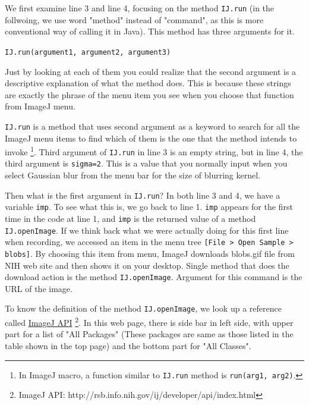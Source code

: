 \documentclass[11pt,a4paper,oneside]{report}
\newcommand{\ijmenu}[1]{\texttt{\small#1}}
\newcommand{\ilcom}[1]{\texttt{\small#1}}
\begin{document}
%


We first examine line 3 and line 4, focusing on the method \ilcom{IJ.run}  
(in the follwoing, we use word "method" instead of "command", as this is more 
conventional way of calling it in Java). This method has three arguments for it.

\ilcom{IJ.run(argument1, argument2, argument3)}

 Just by looking at each of them you could realize that the second argument 
 is a descriptive explanation of what the method does. 
 This is because these strings are exactly the phrase of the menu item you see 
 when you choose that function from ImageJ menu. 

\ilcom{IJ.run} is a method that uses second argument as a keyword 
to search for all the ImageJ menu items to find which of them is the one 
that the method intends to invoke 
\footnote{In ImageJ macro, a function similar to \ilcom{IJ.run} 
method is \ilcom{run(arg1, arg2)}.}. 
Third argument of \ilcom{IJ.run} in line 3 is an empty string, 
but in line 4, the third argument is \ilcom{sigma=2}. 
This is a value that you normally input when you select Gaussian blur 
from the menu bar for the size of blurring kernel. 

Then what is the first argument in \ilcom{IJ.run}? 
In both line 3 and 4, we have a variable \ilcom{imp}. 
To see what this is, we go back to line 1. 
\ilcom{imp} appears for the first time in the code at line 1, 
and \ilcom{imp} is the returned value of a method \ilcom{IJ.openImage}. 
If we think back what we were actually doing for this first line when recording, 
we accessed an item in the menu tree \ijmenu{[File > Open Sample > blobs]}. 
By choosing this item from menu, ImageJ downloads blobs.gif file from NIH web site 
and then shows it on your desktop. 
Single method that does the download action is the method \ilcom{IJ.openImage}. 
Argument for this command is the URL of the image. 

To know the definition of the method \ilcom{IJ.openImage}, 
we look up a reference called 
\href{http://rsb.info.nih.gov/ij/developer/api/index.html}{ImageJ API}
\footnote{ ImageJ API: http://rsb.info.nih.gov/ij/developer/api/index.html}. 
In this web page, there is side bar in left side, with upper part 
for a list of "All Packages" 
(These packages are same as those listed in the table shown in the top page) 
and the bottom part for "All Classes".  
\end{document}
